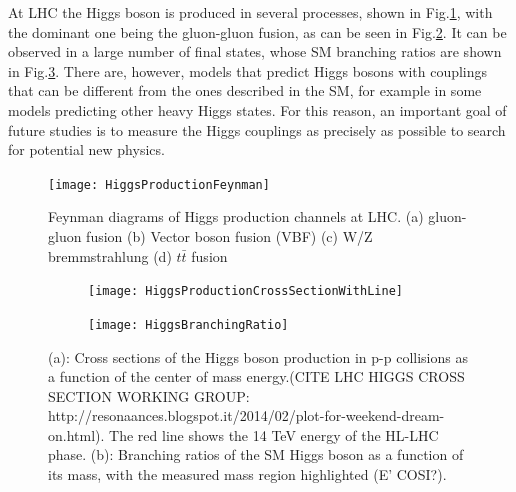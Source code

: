 \documentclass[a4paper,twoside,12pt]{article}
\begin{document}
At LHC the Higgs boson is produced in several processes, shown in Fig.\ref{fig:HiggsProductionFeynman}, with
the dominant one being the gluon-gluon fusion, as can be seen in Fig.\ref{fig:HiggsProductionCrossSection}. It can be observed
in a large number of final states, whose SM branching ratios are shown in Fig.\ref{fig:HiggsBranchingRatio}. There are, however, models that
predict Higgs bosons with couplings that can be different from the ones described in the
SM, for example in some models predicting other heavy Higgs states. For this reason, an important goal of future studies is
to measure the Higgs couplings as precisely as possible to search for potential new physics. \\

\begin{figure} [h]
	\centering
	\texttt{[image: HiggsProductionFeynman]}
	\caption{Feynman diagrams of Higgs production channels at LHC\cite{HiggsFeynman}. (a) gluon-gluon fusion (b) Vector boson fusion (VBF) (c) W/Z bremmstrahlung (d) $t\bar{t}$ fusion}
	\label{fig:HiggsProductionFeynman}
\end{figure}


\begin{figure}
\centering
\begin{subfigure}{.5\textwidth}
  \centering
  \texttt{[image: HiggsProductionCrossSectionWithLine]}
  \caption{}
  \label{fig:HiggsProductionCrossSection}
\end{subfigure}%
\begin{subfigure}{.5\textwidth}
  \centering
  \texttt{[image: HiggsBranchingRatio]}
  \caption{}
  \label{fig:HiggsBranchingRatio}
\end{subfigure}
\caption{(a): Cross sections of the Higgs boson production in p-p collisions as a function of the center of mass energy.(CITE LHC HIGGS CROSS SECTION WORKING GROUP: http://resonaances.blogspot.it/2014/02/plot-for-weekend-dream-on.html). The red line
shows the 14 TeV energy of the HL-LHC phase. (b): Branching
ratios of the SM Higgs boson as a function of its mass, with the measured mass region highlighted (E' COSI?).}
\label{fig:test}
\end{figure}
\end{document}
